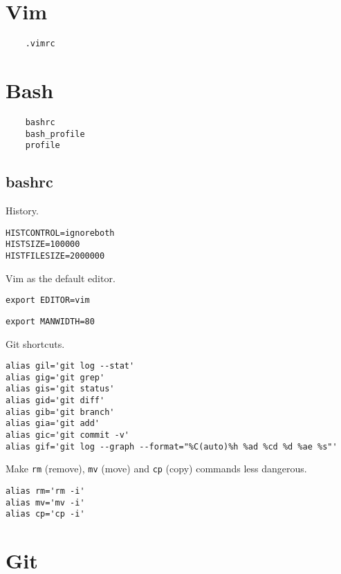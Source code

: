 \documentclass{article}
\begin{document}
\section{Vim}

\begin{verbatim}
	.vimrc
\end{verbatim}

\section{Bash}

\begin{verbatim}
	bashrc
	bash_profile
	profile
\end{verbatim}

\subsection{bashrc}

History.

\begin{verbatim}
HISTCONTROL=ignoreboth
HISTSIZE=100000
HISTFILESIZE=2000000
\end{verbatim}

Vim as the default editor.

\begin{verbatim}
export EDITOR=vim
\end{verbatim}

\begin{verbatim}
export MANWIDTH=80
\end{verbatim}

Git shortcuts.

\begin{verbatim}
alias gil='git log --stat'
alias gig='git grep'
alias gis='git status'
alias gid='git diff'
alias gib='git branch'
alias gia='git add'
alias gic='git commit -v'
alias gif='git log --graph --format="%C(auto)%h %ad %cd %d %ae %s"'
\end{verbatim}

Make \texttt{rm} (remove), \texttt{mv} (move) and \texttt{cp} (copy) commands less dangerous.

\begin{verbatim}
alias rm='rm -i'
alias mv='mv -i'
alias cp='cp -i'
\end{verbatim}

\section{Git}
\end{document}
